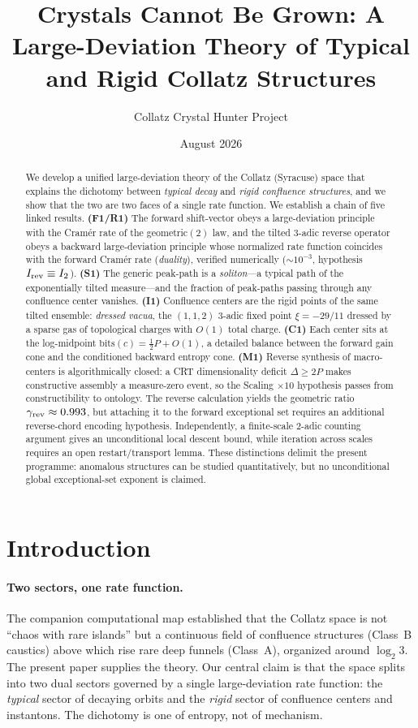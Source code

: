 \documentclass[12pt,a4paper]{article}
\title{Crystals Cannot Be Grown: A Large-Deviation Theory of Typical and Rigid Collatz Structures}
\author{Collatz Crystal Hunter Project}
\date{August 2026}
\begin{document}
\maketitle

\begin{abstract}
We develop a unified large-deviation theory of the Collatz (Syracuse) space that
explains the dichotomy between \emph{typical decay} and \emph{rigid confluence
structures}, and we show that the two are two faces of a single rate function.
We establish a chain of five linked results.
\textbf{(F1/R1)} The forward shift-vector obeys a large-deviation principle with
the Cram\'er rate of the geometric$(2)$ law, and the tilted $3$-adic reverse
operator obeys a backward large-deviation principle whose normalized rate
function coincides with the forward Cram\'er rate (\emph{duality}), verified
numerically ($\sim 10^{-3}$, hypothesis $I_{\rm rev} \equiv I_2$).
\textbf{(S1)} The generic peak-path is a \emph{soliton}---a typical path of the
exponentially tilted measure---and the fraction of peak-paths passing through
any confluence center vanishes.
\textbf{(I1)} Confluence centers are the rigid points of the same tilted
ensemble: \emph{dressed vacua}, the $(1,1,2)$ $3$-adic fixed point
$\xi=-29/11$ dressed by a sparse gas of topological charges with $O(1)$ total
charge.
\textbf{(C1)} Each center sits at the log-midpoint
$\mathrm{bits}(c)=\tfrac12 P+O(1)$, a detailed balance between the forward gain
cone and the conditioned backward entropy cone.
\textbf{(M1)} Reverse synthesis of macro-centers is algorithmically closed: a
CRT dimensionality deficit $\Delta\ge2P$ makes constructive assembly a
measure-zero event, so the Scaling $\times10$ hypothesis passes from
constructibility to ontology.
The reverse calculation yields the geometric ratio
$\gamma_{\rm rev}\approx0.993$, but attaching it to the forward exceptional set
requires an additional reverse-chord encoding hypothesis.  Independently, a
finite-scale $2$-adic counting argument gives an unconditional local descent
bound, while iteration across scales requires an open restart/transport lemma.
These distinctions delimit the present programme: anomalous structures can be
studied quantitatively, but no unconditional global exceptional-set exponent is
claimed.
\end{abstract}

\section{Introduction}
\paragraph{Two sectors, one rate function.}
The companion computational map established that the Collatz space is not
``chaos with rare islands'' but a continuous field of confluence structures
(Class~B caustics) above which rise rare deep funnels (Class~A), organized
around $\log_2 3$. The present paper supplies the theory. Our central claim is
that the space splits into two dual sectors governed by a single
large-deviation rate function: the \emph{typical} sector of decaying orbits and
the \emph{rigid} sector of confluence centers and instantons. The dichotomy is
one of entropy, not of mechanism.
\end{document}
